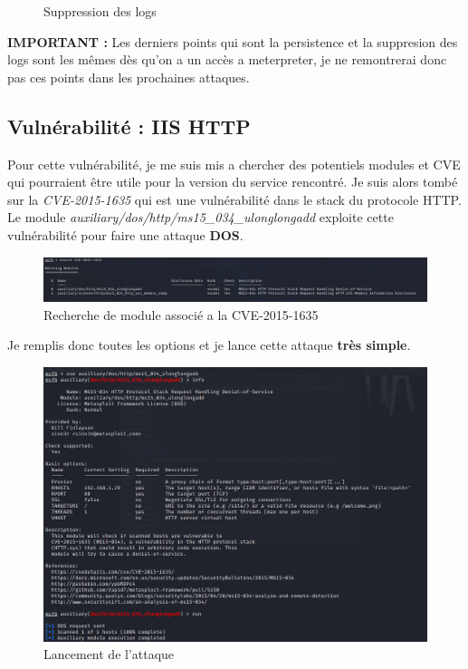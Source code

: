 \documentclass[a4paper]{article}
\begin{document}
\begin{enumerate}
\begin{figure}[H]
    \caption{Suppression des logs}
  \end{figure}
\end{enumerate}
\textbf{IMPORTANT : } Les derniers points qui sont la persistence et la suppresion des logs sont les mêmes dès qu'on a un accès a meterpreter, je ne remontrerai donc pas ces points dans les prochaines attaques.


\subsection{Vulnérabilité : IIS HTTP}
Pour cette vulnérabilité, je me suis mis a chercher des potentiels modules et CVE qui pourraient être utile pour la version du service rencontré. Je suis alors tombé sur la \emph{CVE-2015-1635}
qui est une vulnérabilité dans le stack du protocole HTTP. Le module \emph{auxiliary/dos/http/ms15\_034\_ulonglongadd} exploite cette vulnérabilité pour faire une attaque \textbf{DOS}.
\begin{figure}[H]
  \centering
  \includegraphics[width=17cm]{images/Rapport/kali/W2k8/iis/1.png}
  \caption{Recherche de module associé a la CVE-2015-1635}
\end{figure}
Je remplis donc toutes les options et je lance cette attaque \textbf{très simple}.
\begin{figure}[H]
  \centering
  \includegraphics[width=14cm]{images/Rapport/kali/W2k8/iis/2.png}
  \caption{Lancement de l'attaque}
\end{figure}
\end{document}
